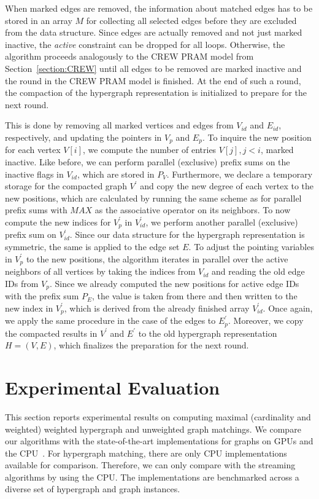 \documentclass[runningheads]{llncs}
\begin{document}
When  marked edges are removed, the information about matched edges has to be stored in an array $M$ for collecting all selected edges before they are excluded from the data structure. Since edges are actually removed and not just marked inactive, the \textit{active} constraint can be dropped for all loops. Otherwise, the algorithm proceeds analogously to the CREW PRAM model from Section~\ref{section:CREW} until all edges to be removed are marked inactive and the round in the CREW PRAM model is finished. At the end of such a round, the compaction of the hypergraph representation is initialized to prepare for the next round. 

This is done by removing all marked vertices and edges from $V_{id}$ and $E_{id}$, respectively, and updating the pointers in $V_{p}$ and $E_{p}$. To inquire the new position for each vertex $V[i]$, we compute the number of entries $V[j], j < i$, marked inactive. Like before, we can perform parallel (exclusive) prefix sums on the inactive flags in $V_{id}$, which are stored in $P_V$. Furthermore, we declare a temporary storage for the compacted graph $V^\prime$ and copy the new degree of each vertex to the new positions, which are calculated by running the same scheme as for parallel prefix sums with $MAX$ as the associative operator on its neighbors. To now compute the new indices for $V^\prime_{p}$ in $V^\prime_{id}$, we perform another parallel (exclusive) prefix sum on $V^\prime_{id}$. Since our data structure for the hypergraph representation is symmetric, the same is applied to the edge set $E$. 
To adjust the pointing variables in $V^\prime_{p}$ to the new positions, the algorithm iterates in parallel over the active neighbors of all vertices by taking the indices from $V_{id}$ and reading the old edge IDs from $V_{p}$. Since we already computed the new positions for active edge IDs with the prefix sum $P_E$, the value is taken from there and then written to the new index in $V^\prime_{p}$, which is derived from the already finished array $V^\prime_{id}$. Once again, we apply the same procedure in the case of the edges to $E^\prime_{p}$.
Moreover, we copy the compacted results in $V^\prime$ and $E^\prime$ to the old hypergraph representation $H = (V, E)$, which finalizes the preparation for the next round.



\section{Experimental Evaluation}\label{sec:exp}
This section reports experimental results on computing  maximal (cardinality and weighted) weighted hypergraph and unweighted graph matchings.
We compare our algorithms with the state-of-the-art implementations for graphs on GPUs \cite{mandulak2024efficient} and the CPU~\cite{birn2013efficient}.
For hypergraph matching, there are only CPU implementations available for comparison.
Therefore, we can only compare with the streaming algorithms by \cite{reinstadtler2025semi} using the CPU.
The implementations are benchmarked across a diverse set of hypergraph and graph instances.
\end{document}
